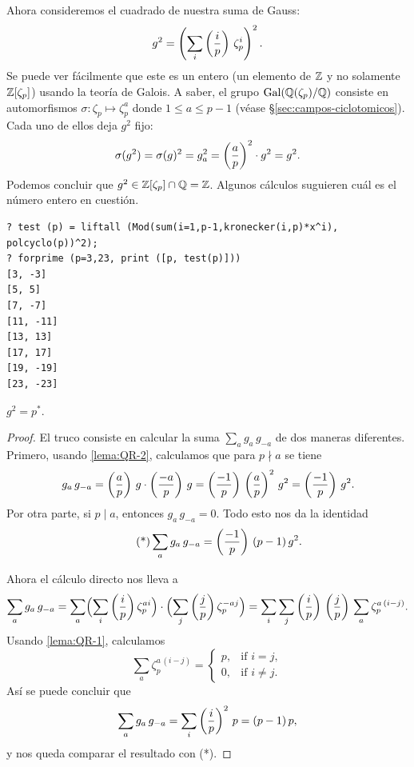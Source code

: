 Ahora consideremos el cuadrado de nuestra suma de Gauss:
$$g^2 = \left(\sum_i \left(\frac{i}{p}\right) \, \zeta_p^i\right)^2.$$
Se puede ver fácilmente que este es un entero (un elemento de $\mathbb{Z}$ y no
solamente $\mathbb{Z} [\zeta_p]$) usando la teoría de Galois. A saber, el grupo
$\operatorname{Gal} (\mathbb{Q} (\zeta_p)/\mathbb{Q})$ consiste en automorfismos
$\sigma\colon \zeta_p \mapsto \zeta_p^a$ donde $1 \le a \le p-1$
(véase \S\ref{sec:campos-ciclotomicos}). Cada uno de ellos deja $g^2$ fijo:
$$\sigma (g^2) = \sigma (g)^2 = g_a^2 = \left(\frac{a}{p}\right)^2\cdot g^2 = g^2.$$
Podemos concluir que $g^2 \in \mathbb{Z} [\zeta_p] \cap \mathbb{Q} = \mathbb{Z}$.
Algunos cálculos suguieren cuál es el número entero en cuestión.

\begin{shaded}
\begin{verbatim}
? test (p) = liftall (Mod(sum(i=1,p-1,kronecker(i,p)*x^i), polcyclo(p))^2);
? forprime (p=3,23, print ([p, test(p)]))
[3, -3]
[5, 5]
[7, -7]
[11, -11]
[13, 13]
[17, 17]
[19, -19]
[23, -23]
\end{verbatim}
\end{shaded}

\begin{lema}
  \label{lema:QR-3}
  $g^2 = p^*$.

  \begin{proof}
    El truco consiste en calcular la suma $\sum_a g_a\,g_{-a}$ de dos maneras
    diferentes. Primero, usando \ref{lema:QR-2}, calculamos que para $p \nmid a$
    se tiene
    \[ g_a\,g_{-a} =
       \left(\frac{a}{p}\right)\,g\cdot \left(\frac{-a}{p}\right)\,g =
       \left(\frac{-1}{p}\right)\,\left(\frac{a}{p}\right)^2\,g^2 =
       \left(\frac{-1}{p}\right)\,g^2. \]
    Por otra parte, si $p \mid a$, entonces $g_a\,g_{-a} = 0$.
    Todo esto nos da la identidad
    \[ \tag{*} \sum_a g_a\,g_{-a} = \left(\frac{-1}{p}\right)\,(p-1)\,g^2. \]

    Ahora el cálculo directo nos lleva a
    \[ \sum_a g_a \, g_{-a} =
       \sum_a \Bigl(\sum_i \left(\frac{i}{p}\right) \zeta_p^{ai}\Bigr)\cdot\Bigl(\sum_j \left(\frac{j}{p}\right) \zeta_p^{-aj}\Bigr) =
       \sum_i \sum_j \left(\frac{i}{p}\right)\,\left(\frac{j}{p}\right)\,\sum_a \zeta_p^{a\,(i-j)}. \]
    Usando \ref{lema:QR-1}, calculamos
    \[ \sum_a \zeta_p^{a\,(i-j)} = \begin{cases}
      p, & \text{if } i = j,\\
      0, & \text{if } i \ne j.
    \end{cases} \]
    Así se puede concluir que
    $$\sum_a g_a \, g_{-a} = \sum_i \left(\frac{i}{p}\right)^2\,p = (p-1)\,p,$$
    y nos queda comparar el resultado con (*).
  \end{proof}
\end{lema}


